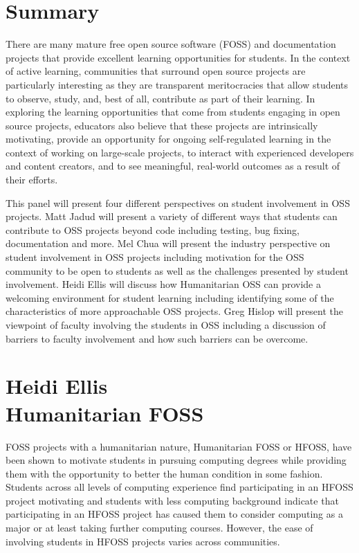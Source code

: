 \documentclass{sig-alternate}
\begin{document}

\section{Summary}
There are many mature free open source software (FOSS) and documentation projects that provide excellent learning opportunities for students.  In the context of active learning, communities that surround open source projects are particularly interesting as they are transparent meritocracies that allow students to observe, study, and, best of all, contribute as part of their learning.  In exploring the learning opportunities that come from students engaging in open source projects, educators also believe that these projects are intrinsically motivating\cite{Bitzer2007160}, provide an opportunity for ongoing self-regulated learning in the context of working on large-scale projects\cite{1089794}, to interact with experienced developers and content creators, and to see meaningful, real-world outcomes as a result of their efforts.

This panel will present four different perspectives on student involvement in OSS projects. Matt Jadud will present a variety of different ways that students can contribute to OSS projects beyond code including  testing, bug fixing, documentation and more. Mel Chua will present the industry perspective on student involvement in OSS projects including motivation for the OSS community to be open to students as well as the challenges presented by student involvement. Heidi Ellis will discuss how Humanitarian OSS can provide a welcoming environment for student learning including identifying some of the characteristics of more approachable OSS projects. Greg Hislop will present the viewpoint of faculty involving the students in OSS including a discussion of barriers to faculty involvement and how such barriers can be overcome. 

\section{Heidi Ellis\\Humanitarian FOSS}
FOSS projects with a humanitarian nature, Humanitarian FOSS or HFOSS, have been shown to motivate students in pursuing computing degrees while providing them with the opportunity to better the human condition in some fashion\cite{1536635}. Students across all levels of computing experience find participating in an HFOSS project motivating and students with less computing background indicate that participating in an HFOSS project has caused them to consider computing as a major or at least taking further computing courses\cite{1562959}. However, the ease of involving students in HFOSS projects varies across communities. 
\end{document}

